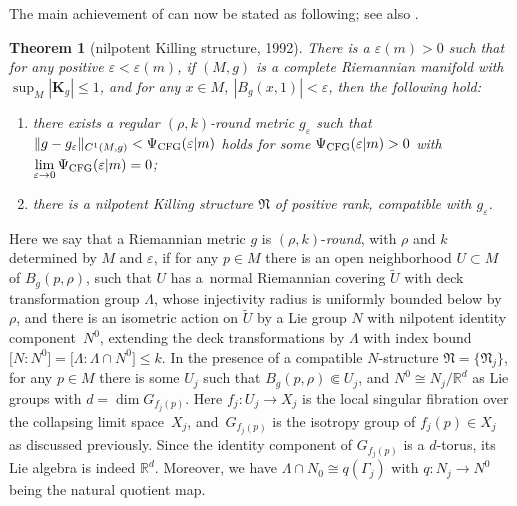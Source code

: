 \documentclass[10pt,a4paper]{amsart}
\numberwithin{equation}{section}
\newtheorem{Theorem}{Theorem}[section]
\begin{document}
The main achievement of \cite{CFG92} can now be stated as following; see also
\cite[Theorem~5.1]{Rong07}.
\begin{Theorem}[nilpotent Killing structure, 1992]\label{thm: CFG}
There is a $\varepsilon(m)>0$ such that for any positive $\varepsilon
<\varepsilon(m)$, if $(M,g)$ is a complete Riemannian manifold with
$\sup_M |\mathbf{K}_g |\le 1$, and for any $x\in M$, $|B_g(x,1)|<\varepsilon$, then the following hold:
\begin{enumerate}\itemsep=0pt
 \item[$1)$] there exists a regular $(\rho,k)$-round metric
 $g_{\varepsilon}$ such that
 $ \|g-g_{\varepsilon} \|_{C^1(M,g)}<\Psi_{\rm CFG}(\varepsilon|m)$ holds
 for some $\Psi_{\rm CFG}(\varepsilon|m)>0$ with
 $\lim\limits_{\varepsilon \to 0}\Psi_{\rm CFG}(\varepsilon|m)=0$;
 \item[$2)$] there is a nilpotent Killing structure $\mathfrak{N}$ of positive rank,
 compatible with $g_{\varepsilon}$.
 \end{enumerate}
\end{Theorem}
Here we say that a Riemannian metric $g$ is $(\rho,k)$-\emph{round}, with $\rho$
and $k$ determined by $M$ and $\varepsilon$, if for any $p\in M$ there is
an open neighborhood $U\subset M$ of $B_g(p,\rho)$, such that $U$ has a~normal
Riemannian covering $\tilde{U}$ with deck transformation group $\Lambda$, whose
injectivity radius is uniformly bounded below by $\rho$, and there is an
isometric action on $\tilde{U}$ by a Lie group $N$ with nilpotent identity
component~$N^0$, extending the deck transformations by $\Lambda$ with index bound
$\big[N:N^0\big] = \big[\Lambda:\Lambda\cap N^0\big] \le k$.
In the presence of a compatible $N$-structure $\mathfrak{N}=\{\mathfrak{N}_j\}$,
for any $p\in M$ there is some $U_j$ such that $B_g(p,\rho)\Subset U_j$, and
$N^0\cong N_j\slash \mathbb{R}^d$ as Lie groups with $d=\dim G_{f_j(p)}$. Here
$f_j\colon U_j\to X_j$ is the local singular fibration over the collapsing limit
space~$X_j$, and~$G_{f_j(p)}$ is the isotropy group of $f_j(p)\in X_j$ as
discussed previously. Since the identity component of $G_{f_j(p)}$ is a
$d$-torus, its Lie algebra is indeed $\mathbb{R}^d$.
Moreover, we have $\Lambda\cap N_0\cong q(\Gamma_j)$ with $q\colon N_j\to N^0$ being
the natural quotient map.
\end{document}
